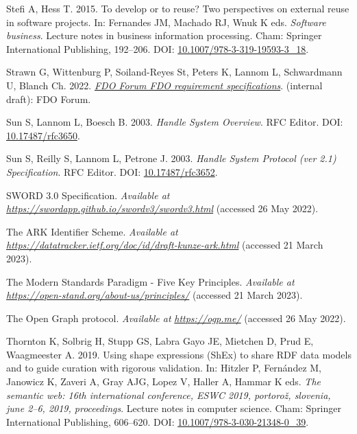 \begin{CSLReferences}{1}{0}
\leavevmode{}%
Stefi A, Hess T. 2015. To develop or to reuse? Two perspectives on external reuse in software projects. In: Fernandes JM, Machado RJ, Wnuk K eds. \emph{Software business}. Lecture notes in business information processing. Cham: Springer International Publishing, 192--206. DOI: \href{https://doi.org/10.1007/978-3-319-19593-3_18}{10.1007/978-3-319-19593-3\_18}.

\leavevmode{}%
Strawn G, Wittenburg P, Soiland-Reyes St, Peters K, Lannom L, Schwardmann U, Blanch Ch. 2022. \emph{\href{https://docs.google.com/document/d/1aGA-TBr4XpORhMPtnf_--Nb4FYJccgeSvGmGh68jNws/edit}{FDO Forum FDO requirement specifications}}. (internal draft): FDO Forum.

\leavevmode{}%
Sun S, Lannom L, Boesch B. 2003. \emph{Handle System Overview}. RFC Editor. DOI: \href{https://doi.org/10.17487/rfc3650}{10.17487/rfc3650}.

\leavevmode{}%
Sun S, Reilly S, Lannom L, Petrone J. 2003. \emph{Handle System Protocol (ver 2.1) Specification}. RFC Editor. DOI: \href{https://doi.org/10.17487/rfc3652}{10.17487/rfc3652}.

\leavevmode{}%
SWORD 3.0 Specification. \emph{Available at} \href{https://swordapp.github.io/swordv3/swordv3.html}{\emph{https://swordapp.github.io/swordv3/swordv3.html}} (accessed 26 May 2022).

\leavevmode{}%
The ARK Identifier Scheme. \emph{Available at} \href{https://datatracker.ietf.org/doc/id/draft-kunze-ark.html}{\emph{https://datatracker.ietf.org/doc/id/draft-kunze-ark.html}} (accessed 21 March 2023).

\leavevmode{}%
The Modern Standards Paradigm - Five Key Principles. \emph{Available at} \href{https://open-stand.org/about-us/principles/}{\emph{https://open-stand.org/about-us/principles/}} (accessed 21 March 2023).

\leavevmode{}%
The Open Graph protocol. \emph{Available at} \href{https://ogp.me/}{\emph{https://ogp.me/}} (accessed 26 May 2022).

\leavevmode{}%
Thornton K, Solbrig H, Stupp GS, Labra Gayo JE, Mietchen D, Prud E, Waagmeester A. 2019. Using shape expressions (ShEx) to share RDF data models and to guide curation with rigorous validation. In: Hitzler P, Fernández M, Janowicz K, Zaveri A, Gray AJG, Lopez V, Haller A, Hammar K eds. \emph{The semantic web: 16th international conference, ESWC 2019, portorož, slovenia, june 2--6, 2019, proceedings}. Lecture notes in computer science. Cham: Springer International Publishing, 606--620. DOI: \href{https://doi.org/10.1007/978-3-030-21348-0_39}{10.1007/978-3-030-21348-0\_39}.


\end{CSLReferences}

